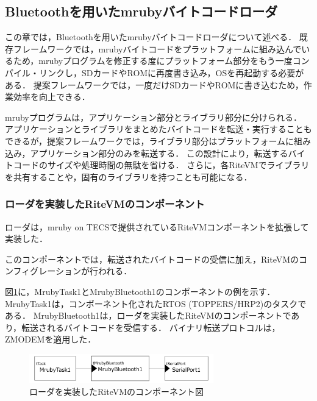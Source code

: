 \documentclass[submit,techrep]{ipsj}
\begin{document}
\subsection{Bluetoothを用いたmrubyバイトコードローダ}
\label{sec:mruby bytecode loader using Bluetooth}
この章では，Bluetoothを用いたmrubyバイトコードローダについて述べる．
既存フレームワークでは，mrubyバイトコードをプラットフォームに組み込んでいるため，mrubyプログラムを修正する度にプラットフォーム部分をもう一度コンパイル・リンクし，SDカードやROMに再度書き込み，OSを再起動する必要がある．
提案フレームワークでは，一度だけSDカードやROMに書き込むため，作業効率を向上できる．

mrubyプログラムは，アプリケーション部分とライブラリ部分に分けられる．
アプリケーションとライブラリをまとめたバイトコードを転送・実行することもできるが，提案フレームワークでは，ライブラリ部分はプラットフォームに組み込み，アプリケーション部分のみを転送する．
この設計により，転送するバイトコードのサイズや処理時間の無駄を省ける．
さらに，各RiteVMでライブラリを共有することや，固有のライブラリを持つことも可能になる．


\subsubsection{ローダを実装したRiteVMのコンポーネント}
ローダは，mruby on TECSで提供されているRiteVMコンポーネント\cite{par:mrubyonTECS}を拡張して実装した．

このコンポーネントでは，転送されたバイトコードの受信に加え，RiteVMのコンフィグレーションが行われる．

図\ref{fig:component_bluetooth}に，MrubyTask1とMrubyBluetooth1のコンポーネントの例を示す．
MrubyTask1は，コンポーネント化されたRTOS (TOPPERS/HRP2)のタスクである．
MrubyBluetooth1は，ローダを実装したRiteVMのコンポーネントであり，転送されるバイトコードを受信する．
バイナリ転送プロトコルは，ZMODEMを適用した．

\begin{figure}[t]
    \centering
    \includegraphics[width=8cm,clip]{../EMSOFT2016/figure/component_bluetooth.pdf}
    \vspace{-2mm}
    \caption{ローダを実装したRiteVMのコンポーネント図}
\vspace{-5mm}
    \label{fig:component_bluetooth}
\end{figure}
\end{document}
